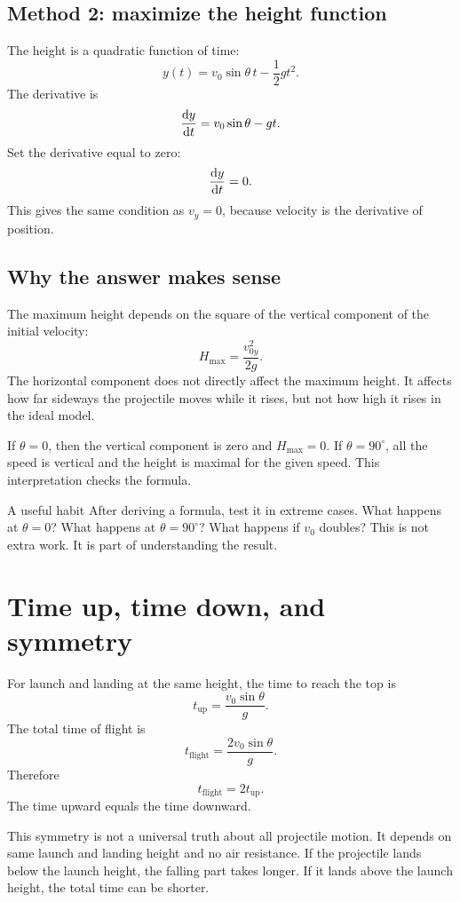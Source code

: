 \documentclass[11pt,a4paper]{article}
\begin{document}
\subsection{Method 2: maximize the height function}

The height is a quadratic function of time:
\[
y(t)=v_0\sin\theta\,t-\frac12gt^2.
\]
The derivative is
\[
\dv{y}{t}=v_0\sin\theta-gt.
\]
Set the derivative equal to zero:
\[
\dv{y}{t}=0.
\]
This gives the same condition as $v_y=0$, because velocity is the derivative of position.

\subsection{Why the answer makes sense}

The maximum height depends on the square of the vertical component of the initial velocity:
\[
H_{\max}=\frac{v_{0y}^2}{2g}.
\]
The horizontal component does not directly affect the maximum height. It affects how far sideways the projectile moves while it rises, but not how high it rises in the ideal model.

If $\theta=0$, then the vertical component is zero and $H_{\max}=0$. If $\theta=90^\circ$, all the speed is vertical and the height is maximal for the given speed. This interpretation checks the formula.

\begin{methodbox}{A useful habit}
After deriving a formula, test it in extreme cases. What happens at $\theta=0$? What happens at $\theta=90^\circ$? What happens if $v_0$ doubles? This is not extra work. It is part of understanding the result.
\end{methodbox}

\section{Time up, time down, and symmetry}

For launch and landing at the same height, the time to reach the top is
\[
t_{\mathrm{up}}=\frac{v_0\sin\theta}{g}.
\]
The total time of flight is
\[
t_{\mathrm{flight}}=\frac{2v_0\sin\theta}{g}.
\]
Therefore
\[
t_{\mathrm{flight}}=2t_{\mathrm{up}}.
\]
The time upward equals the time downward.

This symmetry is not a universal truth about all projectile motion. It depends on same launch and landing height and no air resistance. If the projectile lands below the launch height, the falling part takes longer. If it lands above the launch height, the total time can be shorter.
\end{document}

